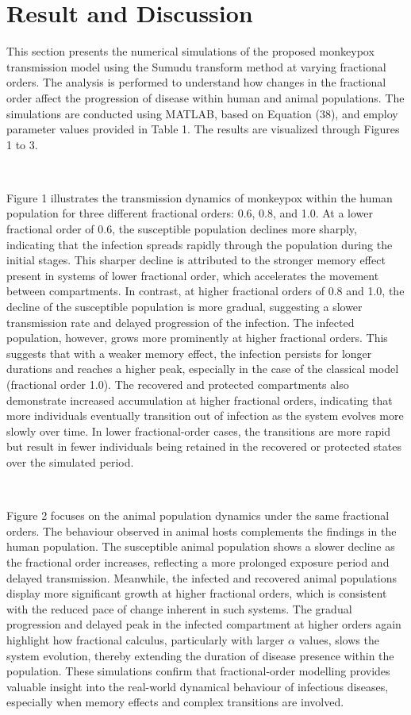 \documentclass[10pt]{NSP1}
\begin{document}
\section{Result and Discussion}

This section presents the numerical simulations of the proposed monkeypox transmission model using the Sumudu transform method at varying fractional orders. The analysis is performed to understand how changes in the fractional order affect the progression of disease within human and animal populations. The simulations are conducted using MATLAB, based on Equation (38), and employ parameter values provided in Table 1. The results are visualized through Figures 1 to 3.


~


Figure 1 illustrates the transmission dynamics of monkeypox within the human population for three different fractional orders: 0.6, 0.8, and 1.0. At a lower fractional order of 0.6, the susceptible population declines more sharply, indicating that the infection spreads rapidly through the population during the initial stages. This sharper decline is attributed to the stronger memory effect present in systems of lower fractional order, which accelerates the movement between compartments. In contrast, at higher fractional orders of 0.8 and 1.0, the decline of the susceptible population is more gradual, suggesting a slower transmission rate and delayed progression of the infection. The infected population, however, grows more prominently at higher fractional orders. This suggests that with a weaker memory effect, the infection persists for longer durations and reaches a higher peak, especially in the case of the classical model (fractional order 1.0). The recovered and protected compartments also demonstrate increased accumulation at higher fractional orders, indicating that more individuals eventually transition out of infection as the system evolves more slowly over time. In lower fractional-order cases, the transitions are more rapid but result in fewer individuals being retained in the recovered or protected states over the simulated period.


~


Figure 2 focuses on the animal population dynamics under the same fractional orders. The behaviour observed in animal hosts complements the findings in the human population. The susceptible animal population shows a slower decline as the fractional order increases, reflecting a more prolonged exposure period and delayed transmission. Meanwhile, the infected and recovered animal populations display more significant growth at higher fractional orders, which is consistent with the reduced pace of change inherent in such systems. The gradual progression and delayed peak in the infected compartment at higher orders again highlight how fractional calculus, particularly with larger $\alpha$ values, slows the system evolution, thereby extending the duration of disease presence within the population. These simulations confirm that fractional-order modelling provides valuable insight into the real-world dynamical behaviour of infectious diseases, especially when memory effects and complex transitions are involved.
\end{document}
